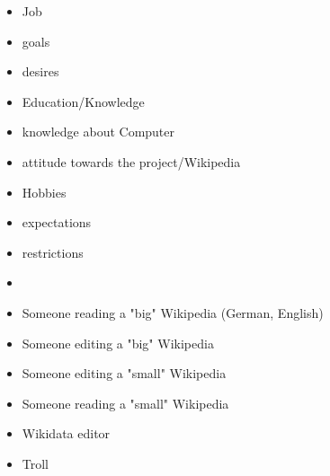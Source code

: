 \begin{itemize}
\item Job
\item goals
\item desires
\item Education/Knowledge
\item knowledge about Computer
\item attitude towards the project/Wikipedia
\item Hobbies
\item expectations
\item restrictions

\item
\item Someone reading a "big" Wikipedia (German, English)
\item Someone editing a "big" Wikipedia
\item Someone editing a "small" Wikipedia
\item Someone reading a "small" Wikipedia 
\item Wikidata editor
\item Troll
\end{itemize}
